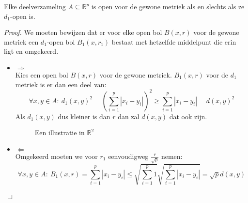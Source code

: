 \documentclass[main.tex]{subfiles}
\begin{document}
\begin{st}
  Elke deelverzameling $A\subseteq \mathbb{R}^{p}$ is open voor de gewone metriek als en slechts als ze $d_{1}$-open is.

  \begin{proof}
    We moeten bewijzen dat er voor elke open bol $B(x,r)$ voor de gewone metriek een $d_{1}$-open bol $B_{1}(x,r_{1})$ bestaat met hetzelfde middelpunt die erin ligt en omgekeerd.
    \begin{itemize}
    \item $\Rightarrow$\\
      Kies een open bol $B(x,r)$ voor de gewone metriek.
      $B_{1}(x,r)$ voor de $d_{1}$ metriek is er dan een deel van:
      \[ \forall x,y\in A:\ d_{1}(x,y)^{2} = \left(\sum_{i=1}^{p}|x_{i}-y_{i}|\right)^{2} \ge \sum_{i=1}^{p}|x_{i}-y_{i}| = d(x,y)^{2} \]
      Als $d_{1}(x,y)$ dus kleiner is dan $r$ dan zal $d(x,y)$ dat ook zijn.

      \begin{figure}[H]
        \centering
        \caption{Een illustratie in $\mathbb{R}^{2}$}
      \end{figure}

    \item $\Leftarrow$\\
      Omgekeerd moeten we voor $r_{1}$ eenvoudigweg $\frac{r}{\sqrt{p}}$ nemen:
      \[ \forall x,y \in A:\ B_{1}(x,r) = \sum_{i=1}^{p}|x_{i}-y_{i}| \le \sqrt{\sum_{i=1}^{p}1} \sqrt{\sum_{i=1}^{p}|x_{i}-y_{i}|} = \sqrt{p}d(x,y) \]


\end{itemize}
\end{proof}
\end{st}
\end{document}
